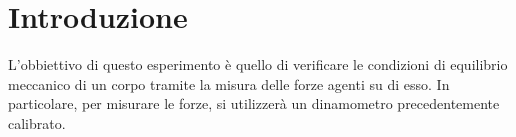 \section*{Introduzione}

L'obbiettivo di questo esperimento è quello di verificare le condizioni di equilibrio meccanico di un corpo tramite la misura delle forze
agenti su di esso. In particolare, per misurare le forze, si utilizzerà un dinamometro precedentemente calibrato.
